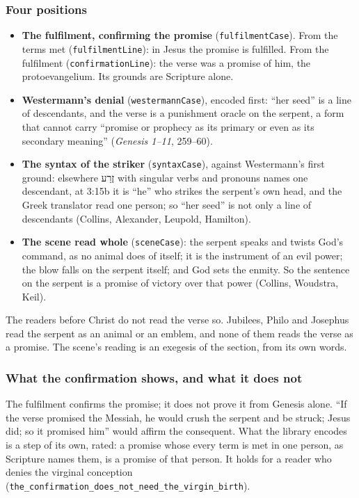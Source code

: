 \documentclass[11pt]{article}
\begin{document}
\subsubsection*{Four positions}
\begin{itemize}
  \item \textbf{The fulfilment, confirming the promise} (\texttt{fulfilment\allowbreak{}Case}). From the terms met (\texttt{fulfilment\allowbreak{}Line}): in Jesus the promise is fulfilled. From the fulfilment (\texttt{confirmation\allowbreak{}Line}): the verse was a promise of him, the protoevangelium. Its grounds are Scripture alone.
  \item \textbf{Westermann’s denial} (\texttt{westermann\allowbreak{}Case}), encoded first: “her seed” is a line of descendants, and the verse is a punishment oracle on the serpent, a form that cannot carry “promise or prophecy as its primary or even as its secondary meaning” (\emph{Genesis 1–11}, 259–60).
  \item \textbf{The syntax of the striker} (\texttt{syntax\allowbreak{}Case}), against Westermann’s first ground: elsewhere זֶרַע with singular verbs and pronouns names one descendant, at 3:15b it is “he” who strikes the serpent’s own head, and the Greek translator read one person; so “her seed” is not only a line of descendants (Collins, Alexander, Leupold, Hamilton).
  \item \textbf{The scene read whole} (\texttt{scene\allowbreak{}Case}): the serpent speaks and twists God’s command, as no animal does of itself; it is the instrument of an evil power; the blow falls on the serpent itself; and God sets the enmity. So the sentence on the serpent is a promise of victory over that power (Collins, Woudstra, Keil).
\end{itemize}
The readers before Christ do not read the verse so. Jubilees, Philo and Josephus read the serpent as an animal or an emblem, and none of them reads the verse as a promise. The scene’s reading is an exegesis of the section, from its own words.

\subsubsection*{What the confirmation shows, and what it does not}
The fulfilment confirms the promise; it does not prove it from Genesis alone. “If the verse promised the Messiah, he would crush the serpent and be struck; Jesus did; so it promised him” would affirm the consequent. What the library encodes is a step of its own, rated: a promise whose every term is met in one person, as Scripture names them, is a promise of that person. It holds for a reader who denies the virginal conception (\texttt{the\_\allowbreak{}confirmation\_\allowbreak{}does\_\allowbreak{}not\_\allowbreak{}need\_\allowbreak{}the\_\allowbreak{}virgin\_\allowbreak{}birth}).
\end{document}
